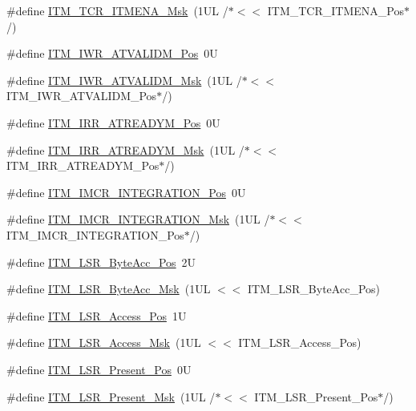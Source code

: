 \begin{DoxyCompactItemize}
\item 
\#define \hyperlink{group___c_m_s_i_s___i_t_m_ga7dd53e3bff24ac09d94e61cb595cb2d9}{I\-T\-M\-\_\-\-T\-C\-R\-\_\-\-I\-T\-M\-E\-N\-A\-\_\-\-Msk}~(1\-U\-L /$\ast$$<$$<$ I\-T\-M\-\_\-\-T\-C\-R\-\_\-\-I\-T\-M\-E\-N\-A\-\_\-\-Pos$\ast$/)
\item 
\#define \hyperlink{group___c_m_s_i_s___i_t_m_ga04d3f842ad48f6a9127b4cecc963e1d7}{I\-T\-M\-\_\-\-I\-W\-R\-\_\-\-A\-T\-V\-A\-L\-I\-D\-M\-\_\-\-Pos}~0\-U
\item 
\#define \hyperlink{group___c_m_s_i_s___i_t_m_ga67b969f8f04ed15886727788f0e2ffd7}{I\-T\-M\-\_\-\-I\-W\-R\-\_\-\-A\-T\-V\-A\-L\-I\-D\-M\-\_\-\-Msk}~(1\-U\-L /$\ast$$<$$<$ I\-T\-M\-\_\-\-I\-W\-R\-\_\-\-A\-T\-V\-A\-L\-I\-D\-M\-\_\-\-Pos$\ast$/)
\item 
\#define \hyperlink{group___c_m_s_i_s___i_t_m_ga259edfd1d2e877a62e06d7a240df97f4}{I\-T\-M\-\_\-\-I\-R\-R\-\_\-\-A\-T\-R\-E\-A\-D\-Y\-M\-\_\-\-Pos}~0\-U
\item 
\#define \hyperlink{group___c_m_s_i_s___i_t_m_ga3dbc3e15f5bde2669cd8121a1fe419b9}{I\-T\-M\-\_\-\-I\-R\-R\-\_\-\-A\-T\-R\-E\-A\-D\-Y\-M\-\_\-\-Msk}~(1\-U\-L /$\ast$$<$$<$ I\-T\-M\-\_\-\-I\-R\-R\-\_\-\-A\-T\-R\-E\-A\-D\-Y\-M\-\_\-\-Pos$\ast$/)
\item 
\#define \hyperlink{group___c_m_s_i_s___i_t_m_ga08de02bf32caf48aaa29f7c68ff5d755}{I\-T\-M\-\_\-\-I\-M\-C\-R\-\_\-\-I\-N\-T\-E\-G\-R\-A\-T\-I\-O\-N\-\_\-\-Pos}~0\-U
\item 
\#define \hyperlink{group___c_m_s_i_s___i_t_m_ga8838bd3dd04c1a6be97cd946364a3fd2}{I\-T\-M\-\_\-\-I\-M\-C\-R\-\_\-\-I\-N\-T\-E\-G\-R\-A\-T\-I\-O\-N\-\_\-\-Msk}~(1\-U\-L /$\ast$$<$$<$ I\-T\-M\-\_\-\-I\-M\-C\-R\-\_\-\-I\-N\-T\-E\-G\-R\-A\-T\-I\-O\-N\-\_\-\-Pos$\ast$/)
\item 
\#define \hyperlink{group___c_m_s_i_s___i_t_m_gabfae3e570edc8759597311ed6dfb478e}{I\-T\-M\-\_\-\-L\-S\-R\-\_\-\-Byte\-Acc\-\_\-\-Pos}~2\-U
\item 
\#define \hyperlink{group___c_m_s_i_s___i_t_m_ga91f492b2891bb8b7eac5b58de7b220f4}{I\-T\-M\-\_\-\-L\-S\-R\-\_\-\-Byte\-Acc\-\_\-\-Msk}~(1\-U\-L $<$$<$ I\-T\-M\-\_\-\-L\-S\-R\-\_\-\-Byte\-Acc\-\_\-\-Pos)
\item 
\#define \hyperlink{group___c_m_s_i_s___i_t_m_ga144a49e12b83ad9809fdd2769094fdc0}{I\-T\-M\-\_\-\-L\-S\-R\-\_\-\-Access\-\_\-\-Pos}~1\-U
\item 
\#define \hyperlink{group___c_m_s_i_s___i_t_m_gac8ae69f11c0311da226c0c8ec40b3d37}{I\-T\-M\-\_\-\-L\-S\-R\-\_\-\-Access\-\_\-\-Msk}~(1\-U\-L $<$$<$ I\-T\-M\-\_\-\-L\-S\-R\-\_\-\-Access\-\_\-\-Pos)
\item 
\#define \hyperlink{group___c_m_s_i_s___i_t_m_gaf5740689cf14564d3f3fd91299b6c88d}{I\-T\-M\-\_\-\-L\-S\-R\-\_\-\-Present\-\_\-\-Pos}~0\-U
\item 
\#define \hyperlink{group___c_m_s_i_s___i_t_m_gaa5bc2a7f5f1d69ff819531f5508bb017}{I\-T\-M\-\_\-\-L\-S\-R\-\_\-\-Present\-\_\-\-Msk}~(1\-U\-L /$\ast$$<$$<$ I\-T\-M\-\_\-\-L\-S\-R\-\_\-\-Present\-\_\-\-Pos$\ast$/)
\end{DoxyCompactItemize}


